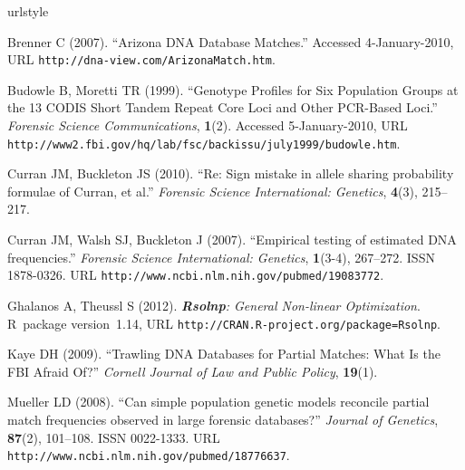 \documentclass[a4paper,11pt]{article}
\newcommand{\proglang}[1]{\textsf{#1}}
\newcommand{\pkg}[1]{\textbf{#1}}
\begin{document}


\begin{thebibliography}{}
\newcommand{\enquote}[1]{``#1''}
\providecommand{\natexlab}[1]{#1}
\providecommand{\url}[1]{\texttt{#1}}
\providecommand{\urlprefix}{URL }
\expandafter\ifx\csname urlstyle\endcsname\relax
  \providecommand{\doi}[1]{doi:\discretionary{}{}{}#1}\else
  \providecommand{\doi}{doi:\discretionary{}{}{}\begingroup
  \urlstyle{rm}\Url}\fi
\providecommand{\eprint}[2][]{\url{#2}}

Brenner C (2007).
\newblock \enquote{Arizona {DNA} Database Matches.}
\newblock Accessed 4-January-2010,
  \urlprefix\url{http://dna-view.com/ArizonaMatch.htm}.

Budowle B, Moretti TR (1999).
\newblock \enquote{Genotype Profiles for Six Population Groups at the 13
  {CODIS} Short Tandem Repeat Core Loci and Other {PCR}-Based Loci.}
\newblock \emph{Forensic Science Communications}, \textbf{1}(2).
\newblock Accessed 5-January-2010,
  \urlprefix\url{http://www2.fbi.gov/hq/lab/fsc/backissu/july1999/budowle.htm}.

Curran JM, Buckleton JS (2010).
\newblock \enquote{Re: Sign mistake in allele sharing probability formulae of
  {C}urran, et al.}
\newblock \emph{Forensic Science International: Genetics}, \textbf{4}(3),
  215--217.

Curran JM, Walsh SJ, Buckleton J (2007).
\newblock \enquote{Empirical testing of estimated {DNA} frequencies.}
\newblock \emph{Forensic Science International: Genetics}, \textbf{1}(3-4),
  267--272.
\newblock ISSN 1878-0326.
\newblock \urlprefix\url{http://www.ncbi.nlm.nih.gov/pubmed/19083772}.

Ghalanos A, Theussl S (2012).
\newblock \emph{\pkg{Rsolnp}: General Non-linear Optimization}.
\newblock \proglang{R}~package version~1.14,
  \urlprefix\url{http://CRAN.R-project.org/package=Rsolnp}.

Kaye DH (2009).
\newblock \enquote{Trawling {DNA} Databases for Partial Matches: What Is the
  {FBI} Afraid Of?}
\newblock \emph{Cornell Journal of Law and Public Policy}, \textbf{19}(1).

Mueller LD (2008).
\newblock \enquote{Can simple population genetic models reconcile partial match
  frequencies observed in large forensic databases?}
\newblock \emph{Journal of Genetics}, \textbf{87}(2), 101--108.
\newblock ISSN 0022-1333.
\newblock \urlprefix\url{http://www.ncbi.nlm.nih.gov/pubmed/18776637}.


\end{thebibliography}
\end{document}
